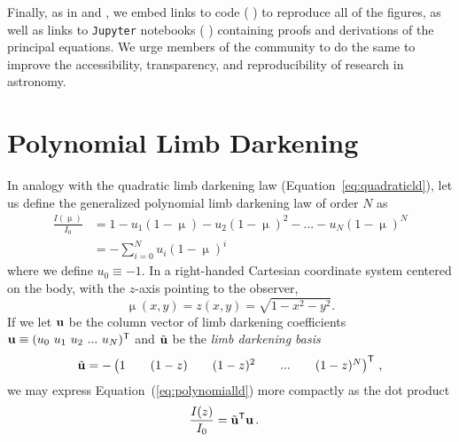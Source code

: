\documentclass[modern,trackchanges]{aastex63}
\begin{document}
Finally, as in \cite{starry} and \cite{AprilFools}, we embed links
to \Python code (\,\codeicon\,) to reproduce all of the
figures, as well as links to \texttt{Jupyter} notebooks
(\,\prooficon\,) containing proofs and derivations
of the principal equations. We urge members of the community to do the same
to improve the accessibility, transparency, and reproducibility of
research in astronomy.


%

\section{Polynomial Limb Darkening}
\label{sec:poly_limbdark}

In analogy with the quadratic
limb darkening law (Equation~\ref{eq:quadraticld}), let us define the
generalized polynomial limb darkening law of order $N$ as
%
%
\begin{align}
    \label{eq:polynomialld}
    \frac{I(\upmu)}{I_0} &= 1 - u_1 (1 - \upmu) - u_2 (1 - \upmu)^2 -
                                ... - u_{N}(1 - \upmu)^{N} \nonumber \\
                          &= -\sum_{i=0}^N u_i (1 - \upmu)^i
\end{align}
%
where we define $u_0 \equiv -1$. In a right-handed Cartesian coordinate system centered
on the body, with the $z$-axis pointing to the observer,
\begin{equation}\label{eq:xyz}
\upmu(x, y) = z(x, y) = \sqrt{1 - x^2 - y^2}.
\end{equation}
%
%
If we let ${\mathbf{u}}$ be the column vector of limb darkening coefficients
$\bvec{u} \equiv (u_0 \ u_1 \ u_2 \ ... \ u_N)^\mathsf{T}$
and $\tilde{\mathbf{u}}$ be the \emph{limb darkening basis}
%
\begin{align}
    \label{eq:ldbasis}
    \ubasis = -\begin{pmatrix}
        1 & &
        (1 - z) & &
        (1 - z)^2 & &
        ... & &
        (1 - z)^N
    \end{pmatrix}^\mathsf{T} \quad,
\end{align}
%
we may
express Equation~(\ref{eq:polynomialld}) more compactly as the
dot product
%
\begin{align}
    \label{eq:polynomialld_vec}
    \frac{I(z)}{I_0} &= \ubasis^\mathsf{T} \bvec{u} \quad .
\end{align}
\end{document}

